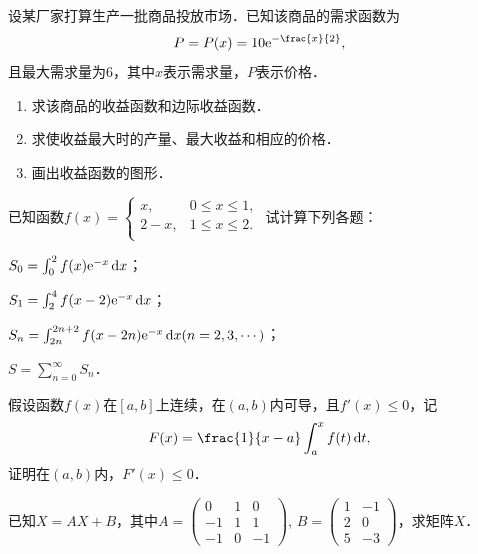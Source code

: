\documentclass[plain,noanswer,medmath]{../../template/jnuexam}
\begin{document}
\begin{problem}
设某厂家打算生产一批商品投放市场．已知该商品的需求函数为
$$P=P(x)=10\e^{-\frac{x}{2}},$$
且最大需求量为$6$，其中$x$表示需求量，$P$表示价格．
\begin{enumerate}
\item 求该商品的收益函数和边际收益函数．%
\item 求使收益最大时的产量、最大收益和相应的价格．%
\item 画出收益函数的图形．%
\end{enumerate}
\end{problem}



\begin{problem}
已知函数$f(x)=\begin{cases}
    x, & 0\le x\le 1, \\
  2-x, & 1\le x\le 2. \\
\end{cases}$ 试计算下列各题：\par
\begin{enumerate*}[itemjoin=\relax]
\item $S_0=\int_0^2f(x)\mathrm{e}^{-x}\mathop{}\!\mathrm{d} x$；\hspace*{1em}%
\item $S_1=\int_2^4f(x-2)\mathrm{e}^{-x}\mathop{}\!\mathrm{d} x$；\\%
\item $S_n=\int_{2n}^{2n+2}f(x-2n)\mathrm{e}^{-x}\mathop{}\!\mathrm{d} x(n=2,3,\cdots)$；\hspace*{1em}%
\item $S=\sum_{n=0}^{\infty}S_n$．%
\end{enumerate*}
\end{problem}



\begin{problem}
假设函数$f(x)$在$[a,b]$上连续，在$(a,b)$内可导，且$f'(x)\le 0$，记
$$F(x)=\frac{1}{x-a}\int_a^x f(t)\dt,$$
证明在$(a,b)$内，$F'(x)\le 0$．
\end{problem}



\begin{problem}
已知$X=AX+B$，其中$A=\begin{pmatrix}
   0 & 1 & 0 \\
  -1 & 1 & 1 \\
  -1 & 0 & -1
\end{pmatrix}$, $B=\begin{pmatrix}
  1 & -1 \\
  2 & 0 \\
  5 & -3
\end{pmatrix}$，求矩阵$X$．
\end{problem}
\end{document}

